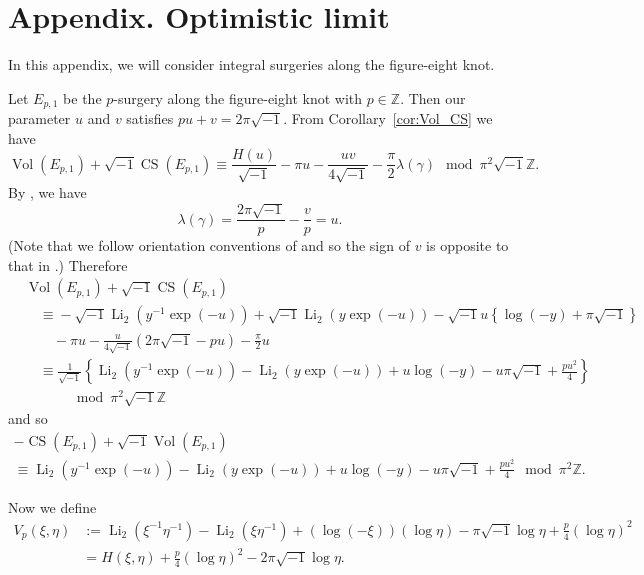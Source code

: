 \documentclass[a4paper]{amsart}
\theoremstyle{plain}
\theoremstyle{definition}
\theoremstyle{remark}
\newcommand{\Z}{\mathbb{Z}}
\newcommand{\Vol}{\operatorname{Vol}}
\newcommand{\CS}{\operatorname{CS}}
\newcommand{\Li}{\operatorname{Li}}
\numberwithin{equation}{section}
\begin{document}
\section*{Appendix. Optimistic limit}
In this appendix, we will consider integral surgeries along the figure-eight
knot.
\par
Let $E_{p,1}$ be the $p$-surgery along the figure-eight knot with $p\in\Z$.
Then our parameter $u$ and $v$ satisfies $pu+v=2\pi\sqrt{-1}$.
From Corollary~\ref{cor:Vol_CS} we have
\begin{equation*}
  \Vol(E_{p,1})+\sqrt{-1}\CS(E_{p,1})
  \equiv
  \frac{H(u)}{\sqrt{-1}}-\pi{u}-\frac{uv}{4\sqrt{-1}}
  -\frac{\pi}{2}\lambda(\gamma)
  \mod{\pi^2\sqrt{-1}\Z}.
\end{equation*}
By \cite[(4.6)]{Meyerhoff/Neumann:COMMH92}, we have
\begin{equation*}
  \lambda(\gamma)
  =\frac{2\pi\sqrt{-1}}{p}-\frac{v}{p}
  =u.
\end{equation*}
(Note that we follow orientation conventions of
\cite{Neumann/Zagier:TOPOL85,Yoshida:INVEM85}
and so the sign of $v$ is opposite to that in \cite{Meyerhoff/Neumann:COMMH92}.)
Therefore
\begin{equation*}
\begin{split}
  &\Vol(E_{p,1})+\sqrt{-1}\CS(E_{p,1})
  \\
  &\quad\equiv
  {}-\sqrt{-1}\Li_2\left(y^{-1}\exp(-u)\right)
  +\sqrt{-1}\Li_2\left(y\exp(-u)\right)
  -\sqrt{-1}u\left\{\log(-y)+\pi\sqrt{-1}\right\}
  \\
  &\quad\quad
  -\pi{u}-\frac{u}{4\sqrt{-1}}(2\pi\sqrt{-1}-pu)
  -\frac{\pi}{2}u
  \\
  &\quad\equiv
  \frac{1}{\sqrt{-1}}
  \left\{
    \Li_2\left(y^{-1}\exp(-u)\right)
    -\Li_2\left(y\exp(-u)\right)
    +u\log(-y)-u\pi\sqrt{-1}+\frac{pu^2}{4}
  \right\}
  \\
  &\quad\quad\quad\mod{\pi^2\sqrt{-1}\Z}
\end{split}
\end{equation*}
and so
\begin{multline*}
  -\CS(E_{p,1})+\sqrt{-1}\Vol(E_{p,1})
  \\
  \equiv
  \Li_2\left(y^{-1}\exp(-u)\right)
  -\Li_2\left(y\exp(-u)\right)
  +u\log(-y)-u\pi\sqrt{-1}+\frac{pu^2}{4}
  \mod{\pi^2\Z}.
\end{multline*}
\par
Now we define
\begin{equation*}
\begin{split}
  V_p(\xi,\eta)
  &:=
  \Li_2\left(\xi^{-1}\eta^{-1}\right)
  -\Li_2\left(\xi\eta^{-1}\right)
  +(\log(-\xi))(\log{\eta})-\pi\sqrt{-1}\log\eta+\frac{p}{4}(\log{\eta})^2
  \\
  &=
  H(\xi,\eta)+\frac{p}{4}(\log{\eta})^2-2\pi\sqrt{-1}\log\eta.
\end{split}
\end{equation*}
\end{document}
